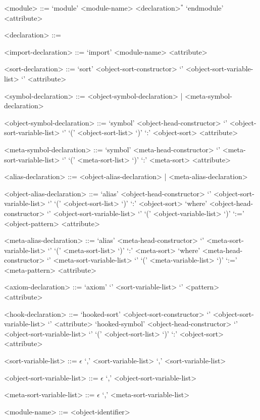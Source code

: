 \documentclass[UTF8,11pt]{article}
\theoremstyle{plain}
\theoremstyle{definition}
\theoremstyle{remark}
\begin{document}
\begin{grammar}\small

<module> ::= \quad
\alt `module' <module-name> <declaration>$^*$ 
`endmodule' <attribute>

<declaration> ::= \quad
{}

<import-declaration> ::= `import' <module-name> <attribute>

<sort-declaration> ::= `sort'
<object-sort-constructor>  `{' <object-sort-variable-list> `}' 
<attribute>

<symbol-declaration> ::= <object-symbol-declaration> | 
<meta-symbol-declaration>

<object-symbol-declaration> ::= \quad
\alt `symbol' <object-head-constructor> 
`{' <object-sort-variable-list> `}' 
`(' <object-sort-list> `)' `:' <object-sort> <attribute>

<meta-symbol-declaration> ::= \quad
\alt `symbol' <meta-head-constructor>
`{'	<meta-sort-variable-list> `}'
 `(' <meta-sort-list> `)' `:' <meta-sort> <attribute>

<alias-declaration> ::= <object-alias-declaration> | <meta-alias-declaration> 

<object-alias-declaration> ::= \quad
\alt `alias' <object-head-constructor> 
`{' <object-sort-variable-list> `}' 
`(' <object-sort-list> `)' `:' <object-sort> 
`where' 
<object-head-constructor> 
`{' <object-sort-variable-list> `}'
`(' <object-variable-list> `)' 
`:='
<object-pattern>
<attribute>

<meta-alias-declaration> ::= \quad
\alt `alias' <meta-head-constructor> 
`{'	<meta-sort-variable-list> `}'
`(' <meta-sort-list> `)' `:' <meta-sort> 
`where' 
<meta-head-constructor> 
`{' <meta-sort-variable-list> `}'
`(' <meta-variable-list> `)' 
`:='
<meta-pattern>
<attribute>

<axiom-declaration> ::= `axiom' `{' <sort-variable-list> `}' <pattern> 
<attribute>

<hook-declaration> ::= \quad
\alt `hooked-sort' <object-sort-constructor>  `{' <object-sort-variable-list> 
`}' <attribute>
\alt `hooked-symbol' <object-head-constructor> 
`{' <object-sort-variable-list> `}' 
`(' <object-sort-list> `)' `:' <object-sort> <attribute>

<sort-variable-list> ::= \quad
\alt $\epsilon$
 `,' <sort-variable-list>
 `,' <sort-variable-list>

<object-sort-variable-list> ::= \quad
\alt $\epsilon$
 `,' <object-sort-variable-list>

<meta-sort-variable-list> ::= \quad
\alt $\epsilon$
 `,' <meta-sort-variable-list>

<module-name> ::= <object-identifier>
\end{grammar}
\end{document}
